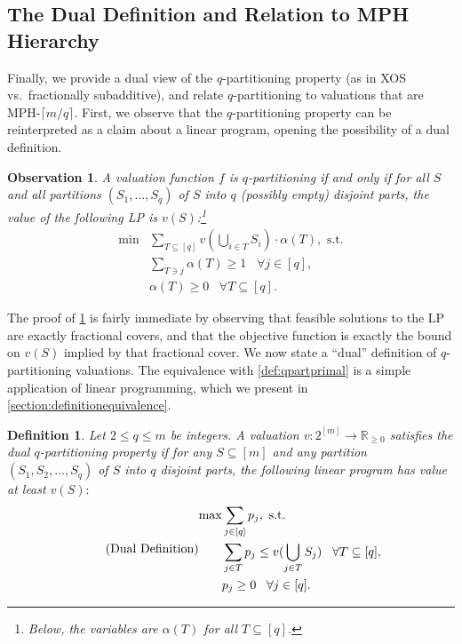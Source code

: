 \documentclass[11pt]{article}%
\newtheorem{definition}[theorem]{Definition}
\newtheorem{observation}[theorem]{Observation}
\numberwithin{theorem}{subsection}
\begin{document}
\subsection{The Dual Definition and Relation to MPH Hierarchy}\label{sec:dualqpart}
Finally, we provide a dual view of the $q$-partitioning property (as in XOS vs.~fractionally subadditive), and relate $q$-partitioning to valuations that are MPH-$\lceil m/q \rceil$. First, we observe that the $q$-partitioning property can be reinterpreted as a claim about a linear program, opening the possibility of a dual definition.

\begin{observation}\label{obs:primal} A valuation function $f$ is $q$-partitioning if and only if for all $S$ and all partitions $(S_1,\ldots, S_q)$ of $S$ into $q$ (possibly empty) disjoint parts, the value of the following LP is $v(S)$:\footnote{Below, the variables are $\alpha(T)$ for all $T \subseteq [q]$.}
\begin{equation}
\label{eq:qpartprimalLP}
    \begin{split}
        \min &\sum_{{T}\subseteq [q]}v(\bigcup_{i \in T}S_i)\cdot \alpha(T), \text{ s.t.}\\
        & \sum_{T \ni j} \alpha(T)\ge 1 \; \; \; \forall j\in [q],\\
        &\alpha(T)\ge 0 \; \; \; \forall T\subseteq [q].
    \end{split}
\end{equation}
\end{observation}

The proof of \cref{obs:primal} is fairly immediate by observing that feasible solutions to the LP are exactly fractional covers, and that the objective function is exactly the bound on $v(S)$ implied by that fractional cover. We now state a ``dual'' definition of $q$-partitioning valuations. The equivalence with \cref{def:qpartprimal} is a simple application of linear programming, which we present in \cref{section:definitionequivalence}.

\begin{definition}
\label{def:qpartdual}
Let $2\le q \le m$ be integers. A valuation $v:2^{[m]}\longrightarrow \mathbb{R}_{\ge 0}$ satisfies the dual $q$-partitioning property if for any $S\subseteq [m]$ and any partition $(S_1, S_2, \ldots, S_q)$ of $S$ into $q$ disjoint parts, the following linear program has value at least $v(S):$
\begin{equation}
\tag{\text{Dual Definition}}
\label{eq:qpartdualLP}
    \begin{split}
        \max &\sum_{j \in [q]} p_j, \text{ s.t.}\\
        & \sum_{j \in T} p_j\le v(\bigcup_{j \in T} S_j) \; \; \; \forall T\subseteq [q],\\
        &p_j\ge 0 \; \; \; \forall j\in [q].
    \end{split}
\end{equation}
\end{definition}
\end{document}
